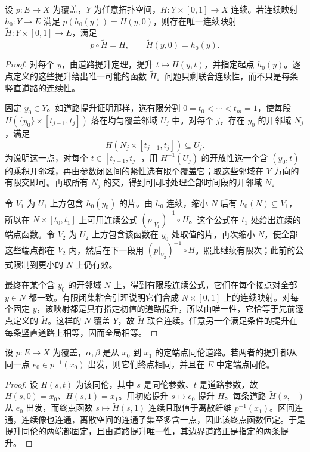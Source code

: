 \begin{theorem}\label{g1:thm:homotopy-lifting}
	设 \(p:E\to X\) 为覆盖，\(Y\) 为任意拓扑空间，\(H:Y\times[0,1]\to X\) 连续。若连续映射 \(h_0:Y\to E\) 满足 \(p(h_0(y))=H(y,0)\)，则存在唯一连续映射 \(\widetilde H:Y\times[0,1]\to E\)，满足
	\[
		p\circ\widetilde H=H,\qquad \widetilde H(y,0)=h_0(y).
	\]
\end{theorem}
\begin{proof}
	对每个 \(y\)，由道路提升定理，提升 \(t\mapsto H(y,t)\)，并指定起点 \(h_0(y)\)。逐点定义的这些提升给出唯一可能的函数 \(\widetilde H\)。问题只剩联合连续性，而不只是每条竖直道路的连续性。

	固定 \(y_0\in Y\)。如道路提升证明那样，选有限分割 \(0=t_0<\cdots<t_m=1\)，使每段 \(H(\{y_0\}\times[t_{j-1},t_j])\) 落在均匀覆盖邻域 \(U_j\) 中。对每个 \(j\)，存在 \(y_0\) 的开邻域 \(N_j\)，满足
	\[
		H(N_j\times[t_{j-1},t_j])\subseteq U_j.
	\]
	为说明这一点，对每个 \(t\in[t_{j-1},t_j]\)，用 \(H^{-1}(U_j)\) 的开放性选一个含 \((y_0,t)\) 的乘积开邻域，再由参数闭区间的紧性选有限个覆盖它；取这些邻域在 \(Y\) 方向的有限交即可。再取所有 \(N_j\) 的交，得到可同时处理全部时间段的开邻域 \(N\)。

	令 \(V_1\) 为 \(U_1\) 上方包含 \(h_0(y_0)\) 的片。由 \(h_0\) 连续，缩小 \(N\) 后有 \(h_0(N)\subseteq V_1\)，所以在 \(N\times[t_0,t_1]\) 上可用连续公式 \((p|_{V_1})^{-1}\circ H\)。这个公式在 \(t_1\) 处给出连续的端点函数。令 \(V_2\) 为 \(U_2\) 上方包含该函数在 \(y_0\) 处取值的片，再次缩小 \(N\)，使全部这些端点都在 \(V_2\) 内，然后在下一段用 \((p|_{V_2})^{-1}\circ H\)。照此继续有限次；此前的公式限制到更小的 \(N\) 上仍有效。

	最终在某个含 \(y_0\) 的开邻域 \(N\) 上，得到有限段连续公式，它们在每个接点对全部 \(y\in N\) 都一致。有限闭集粘合引理说明它们合成 \(N\times[0,1]\) 上的连续映射。对每个固定 \(y\)，该映射都是具有指定初值的道路提升，所以由唯一性，它恰等于先前逐点定义的 \(\widetilde H\)。这样的 \(N\) 覆盖 \(Y\)，故 \(\widetilde H\) 联合连续。任意另一个满足条件的提升在每条竖直道路上相等，因而全局相等。
\end{proof}

\begin{corollary}\label{g1:cor:lifted-path-homotopy}
	设 \(p:E\to X\) 为覆盖，\(\alpha,\beta\) 是从 \(x_0\) 到 \(x_1\) 的定端点同伦道路。若两者的提升都从同一点 \(e_0\in p^{-1}(x_0)\) 出发，则它们终点相同，并且在 \(E\) 中定端点同伦。
\end{corollary}
\begin{proof}
	设 \(H(s,t)\) 为该同伦，其中 \(s\) 是同伦参数、\(t\) 是道路参数，故 \(H(s,0)=x_0\)、\(H(s,1)=x_1\)。用初始提升 \(s\mapsto e_0\) 提升 \(H\)。每条道路 \(\widetilde H(s,-)\) 从 \(e_0\) 出发，而终点函数 \(s\mapsto\widetilde H(s,1)\) 连续且取值于离散纤维 \(p^{-1}(x_1)\)。区间连通，连续像也连通，离散空间的连通子集至多含一点，因此该终点函数恒定。于是提升同伦的两端都固定，且由道路提升唯一性，其边界道路正是指定的两条提升。
\end{proof}

